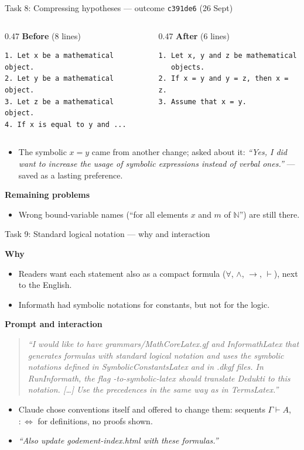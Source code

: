 \documentclass[10pt,aspectratio=169]{beamer}
\newcommand{\commit}[1]{\texttt{\footnotesize #1}}
\newcommand{\prompt}[1]{\begin{quote}\small\itshape ``#1''\end{quote}}
\newcommand{\why}{\par\textcolor{gfblue}{\textbf{Why}}\par}
\newcommand{\how}{\par\textcolor{gfblue}{\textbf{Prompt and interaction}}\par}
\begin{document}
\begin{frame}[fragile]{Task 8: Compressing hypotheses --- outcome}
  \commit{c391de6} (26 Sept)
  \begin{columns}[T]
    \begin{column}{0.47\textwidth}
      \textbf{Before} (8 lines)
\begin{lstlisting}
1. Let x be a mathematical object.
2. Let y be a mathematical object.
3. Let z be a mathematical object.
4. If x is equal to y and ...
\end{lstlisting}
    \end{column}
    \begin{column}{0.47\textwidth}
      \textbf{After} (6 lines)
\begin{lstlisting}
1. Let x, y and z be mathematical
   objects.
2. If x = y and y = z, then x = z.
3. Assume that x = y.
\end{lstlisting}
    \end{column}
  \end{columns}
  \begin{itemize}\small
    \item The symbolic $x = y$ came from another change; asked about it:
          \emph{``Yes, I did want to increase the usage of symbolic expressions
          instead of verbal ones.''} --- saved as a lasting preference.
  \end{itemize}
  \textbf{Remaining problems}
  \begin{itemize}\small
    \item Wrong bound-variable names (``for all elements $x$ and $m$ of $\mathbb{N}$'')
          are still there.
  \end{itemize}
\end{frame}

\begin{frame}{Task 9: Standard logical notation --- why and interaction}
  \why
  \begin{itemize}\small
    \item Readers want each statement also as a compact formula
          ($\forall$, $\land$, $\to$, $\vdash$), next to the English.
    \item Informath had symbolic notations for constants, but not for the logic.
  \end{itemize}
  \how
  \prompt{I would like to have grammars/MathCoreLatex.gf and InformathLatex that
    generates formulas with standard logical notation and uses the symbolic
    notations defined in SymbolicConstantsLatex and in .dkgf files. In
    RunInformath, the flag -to-symbolic-latex should translate Dedukti to this
    notation. [\dots] Use the precedences in the same way as in TermsLatex.}
  \begin{itemize}\small
    \item Claude chose conventions itself and offered to change them: sequents
          $\Gamma \vdash A$, $:\Leftrightarrow$ for definitions, no proofs shown.
    \item \emph{``Also update godement-index.html with these formulas.''}
  \end{itemize}
\end{frame}
\end{document}
